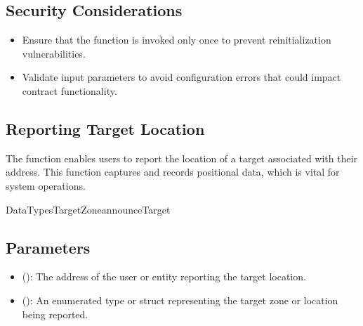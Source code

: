 \documentclass[letterpaper,10pt,english]{sphinxmanual}
\begin{document}
\subsection{Security Considerations}
\label{\detokenize{docs_consensus_mechanism_contract:security-considerations}}\begin{itemize}
\item {} 
\sphinxAtStartPar
{} Ensure that the  function is invoked only once to prevent re\sphinxhyphen{}initialization vulnerabilities.

\item {} 
\sphinxAtStartPar
{} Validate input parameters to avoid configuration errors that could impact contract functionality.

\end{itemize}


\subsection{Reporting Target Location}
\label{\detokenize{docs_consensus_mechanism_contract:reporting-target-location}}
\sphinxAtStartPar
The  function enables users to report the location of a target associated with their address. This function captures and records positional data, which is vital for system operations.

\begin{sphinxVerbatim}[commandchars=\\\{\}]
DataTypesTargetZoneannounceTarget
\end{sphinxVerbatim}


\subsection{Parameters}
\label{\detokenize{docs_consensus_mechanism_contract:id1}}\begin{itemize}
\item {} 
\sphinxAtStartPar
{} ():
The address of the user or entity reporting the target location.

\item {} 
\sphinxAtStartPar
{} ():
An enumerated type or struct representing the target zone or location being reported.

\end{itemize}
\end{document}
